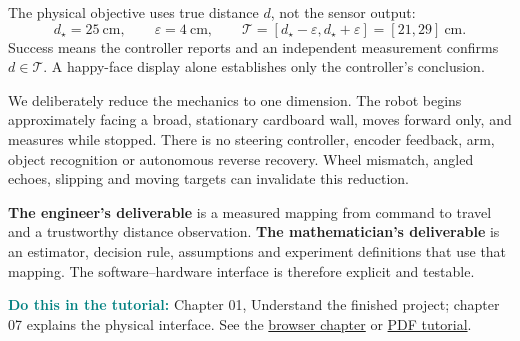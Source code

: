 \documentclass[11pt,a4paper]{article}
\newcommand{\code}[1]{\texttt{\detokenize{#1}}}
\newcommand{\tuto}[2]{\par\textcolor{teal}{\textbf{Do this in the tutorial:}} Chapter #1, #2. See the \href{Tutorial_A_to_Z.html\#t#1}{browser chapter} or \href{Tutorial_A_to_Z.pdf}{PDF tutorial}.\par}
\begin{document}
The physical objective uses true distance $d$, not the sensor output:
\begin{equation}
 d_\star=25\ \mathrm{cm},\qquad \varepsilon=4\ \mathrm{cm},\qquad
 \mathcal T=[d_\star-\varepsilon,d_\star+\varepsilon]=[21,29]\ \mathrm{cm}.
\end{equation}
Success means the controller reports \code{DONE} and an independent measurement confirms $d\in\mathcal T$. A happy-face display alone establishes only the controller's conclusion.

We deliberately reduce the mechanics to one dimension. The robot begins approximately facing a broad, stationary cardboard wall, moves forward only, and measures while stopped. There is no steering controller, encoder feedback, arm, object recognition or autonomous reverse recovery. Wheel mismatch, angled echoes, slipping and moving targets can invalidate this reduction.

\begin{center}
\end{center}
\textbf{The engineer's deliverable} is a measured mapping from command to travel and a trustworthy distance observation. \textbf{The mathematician's deliverable} is an estimator, decision rule, assumptions and experiment definitions that use that mapping. The software--hardware interface is therefore explicit and testable.
\tuto{01}{Understand the finished project; chapter 07 explains the physical interface}
\end{document}
